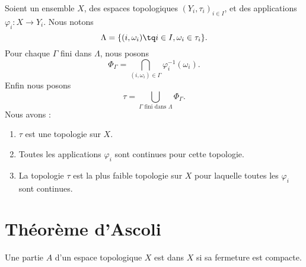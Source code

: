 \begin{proposition}     \label{PROPooGOEVooZBAOQh}
    Soient un ensemble \( X\), des espaces topologiques \( (Y_i,\tau_i)_{i\in I}\), et des applications \( \varphi_i\colon X\to Y_i\). Nous notons
    \begin{equation}
        \Lambda=\{ (i,\omega_i)\tq i\in I, \omega_i\in \tau_i \}.
    \end{equation}
    Pour chaque \( \Gamma\) fini dans \( \Lambda\), nous posons
    \begin{equation}
        \Phi_{\Gamma}=\bigcap_{(i,\omega_i)\in \Gamma}\varphi_i^{-1}(\omega_i).
    \end{equation}
    Enfin nous posons
    \begin{equation}
        \tau=\bigcup_{\Gamma\text{ fini dans } \Lambda}\Phi_{\Gamma}.
    \end{equation}
    Nous avons :
    \begin{enumerate}
        \item
            \( \tau\) est une topologie sur \( X\).
        \item
            Toutes les applications \( \varphi_i\) sont continues pour cette topologie.
        \item
            La topologie \( \tau\) est la plus faible topologie sur \( X\) pour laquelle toutes les \( \varphi_i\) sont continues.
    \end{enumerate}
\end{proposition}

\section{Théorème d'Ascoli}

\begin{definition}
    Une partie \( A\) d'un espace topologique \( X\) est  dans \( X\) si sa fermeture est compacte.
\end{definition}

